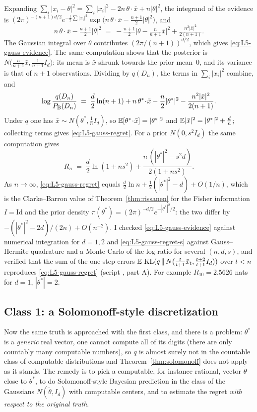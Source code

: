 \begin{beyond}
Expanding $\sum_i|x_i-\theta|^2=\sum_i|x_i|^2-2n\,\theta\!\cdot\!\bar x+n|\theta|^2$, the integrand of the evidence is $(2\pi)^{-(n+1)d/2}e^{-\frac12\sum|x_i|^2}\exp\big(n\,\theta\!\cdot\!\bar x-\frac{n+1}2|\theta|^2\big)$, and
\[
   n\,\theta\!\cdot\!\bar x-\tfrac{n+1}2|\theta|^2\;=\;-\tfrac{n+1}2\Big|\theta-\tfrac n{n+1}\bar x\Big|^2+\tfrac{n^2|\bar x|^2}{2(n+1)} .
\]
The Gaussian integral over $\theta$ contributes $(2\pi/(n+1))^{d/2}$, which gives \eqref{eq:L5-gauss-evidence}. The same computation shows that the posterior is $N\big(\frac n{n+1}\bar x,\frac1{n+1}I_d\big)$: its mean is $\bar x$ shrunk towards the prior mean~$0$, and its variance is that of $n+1$ observations. Dividing by $q(D_n)$, the terms in $\sum_i|x_i|^2$ combine, and
\[
  \log\frac{q(D_n)}{P_{\mathrm{B}}(D_n)}\;=\;\frac d2\ln(n+1)+n\,\theta^*\!\cdot\!\bar x-\frac n2|\theta^*|^2-\frac{n^2|\bar x|^2}{2(n+1)} .
\]
Under $q$ one has $\bar x\sim N(\theta^*,\frac1nI_d)$, so $\mathbb{E}[\theta^*\!\cdot\!\bar x]=|\theta^*|^2$ and $\mathbb{E}|\bar x|^2=|\theta^*|^2+\frac dn$; collecting terms gives \eqref{eq:L5-gauss-regret}. For a prior $N(0,s^2I_d)$ the same computation gives
\begin{equation}\label{eq:L5-gauss-regret-s}
  R_n\;=\;\frac d2\ln(1+ns^2)+\frac{n\,(|\theta^*|^2-s^2d)}{2(1+ns^2)} .
\end{equation}
As $n\to\infty$, \eqref{eq:L5-gauss-regret} equals $\frac d2\ln n+\frac12(|\theta^*|^2-d)+O(1/n)$, which is the Clarke--Barron value of Theorem~\ref{thm:rissanen} for the Fisher information $I=\mathrm{Id}$ and the prior density $\pi(\theta^*)=(2\pi)^{-d/2}e^{-|\theta^*|^2/2}$: the two differ by $-(|\theta^*|^2-2d)/(2n)+O(n^{-2})$. I checked \eqref{eq:L5-gauss-evidence} against numerical integration for $d=1,2$ and \eqref{eq:L5-gauss-regret-s} against Gauss--Hermite quadrature and a Monte Carlo of the log-ratio for several $(n,d,s)$, and verified that the sum of the one-step errors $\mathbb{E}\,\operatorname{KL}(q\,\|\,N(\frac t{t+1}\bar x_t,\frac{t+2}{t+1}I_d))$ over $t<n$ reproduces \eqref{eq:L5-gauss-regret} (script , part A). For example $R_{10}=2.5626$ nats for $d=1$, $|\theta^*|=2$.
\end{beyond}

\subsection{Class 1: a Solomonoff-style discretization}\label{sec:L5-class1}
Now the same truth is approached with the first class, and there is a problem: $\theta^*$ is a \emph{generic} real vector, one cannot compute all of its digits (there are only countably many computable numbers), so $q$ is almost surely not in the countable class of computable distributions and Theorem~\ref{thm:solomonoff} does not apply as it stands. The remedy is to pick a computable, for instance rational, vector $\tilde\theta$ close to $\theta^*$, to do Solomonoff-style Bayesian prediction in the class of the Gaussians $N(\tilde\theta,I_d)$ with computable centers, and to estimate the regret \emph{with respect to the original truth}.

